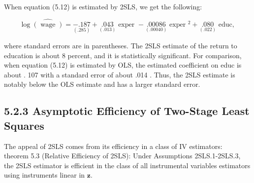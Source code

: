 \documentclass[10pt]{article}
\begin{document}
When equation (5.12) is estimated by 2SLS, we get the following:

$$
\log \widehat{(\text { wage })}=\underset{(.285)}{-.187}+\underset{(.013)}{.043} \text { exper }-\underset{(.00040)}{.00086} \text { exper }^{2}+\underset{(.022)}{.080} \text { educ, }
$$

where standard errors are in parentheses. The 2SLS estimate of the return to education is about 8 percent, and it is statistically significant. For comparison, when equation (5.12) is estimated by OLS, the estimated coefficient on educ is about . 107 with a standard error of about .014 . Thus, the 2SLS estimate is notably below the OLS estimate and has a larger standard error.

\subsection*{5.2.3 Asymptotic Efficiency of Two-Stage Least Squares}
The appeal of 2SLS comes from its efficiency in a class of IV estimators:\\
theorem 5.3 (Relative Efficiency of 2SLS): Under Assumptions 2SLS.1-2SLS.3, the 2SLS estimator is efficient in the class of all instrumental variables estimators using instruments linear in $\mathbf{z}$.
\end{document}
